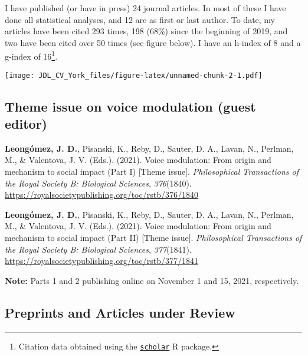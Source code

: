 \documentclass[11pt, a4paper]{awesome-cv}
\begin{document}
I have published (or have in press) 24 journal articles. In most of
these I have done all statistical analyses, and 12 are as first or last
author. To date, my articles have been cited 293 times, 198 (68\%) since
the beginning of 2019, and two have been cited over 50 times (see figure
below). I have an h-index of 8 and a g-index of 16\footnote{Citation
  data obtained using the
  \href{https://cran.r-project.org/web/packages/scholar/index.html}{\texttt{scholar}}
  R package.}.

\texttt{[image: JDL\_CV\_York\_files/figure-latex/unnamed-chunk-2-1.pdf]}

\hypertarget{section}{%
\subsection{\texorpdfstring{\textbf{Theme issue on voice modulation (guest editor)}}{}}\label{section}}

\begingroup
\setlength{\parindent}{-0.5in}
\setlength{\leftskip}{0.5in}

\hypertarget{refs_theme_issue}{}
\leavevmode{}%
\textbf{Leongómez, J. D.}, Pisanski, K., Reby, D., Sauter, D. A., Lavan,
N., Perlman, M., \& Valentova, J. V. (Eds.). (2021). Voice modulation:
From origin and mechanism to social impact ({Part I}) {[}{Theme
issue}{]}. \emph{Philosophical Transactions of the Royal Society B:
Biological Sciences}, \emph{376}(1840).
\url{https://royalsocietypublishing.org/toc/rstb/376/1840}

\leavevmode{}%
\textbf{Leongómez, J. D.}, Pisanski, K., Reby, D., Sauter, D. A., Lavan,
N., Perlman, M., \& Valentova, J. V. (Eds.). (2021). Voice modulation:
From origin and mechanism to social impact ({Part II}) {[}{Theme
issue}{]}. \emph{Philosophical Transactions of the Royal Society B:
Biological Sciences}, \emph{377}(1841).
\url{https://royalsocietypublishing.org/toc/rstb/377/1841}

\endgroup

\textbf{Note:} Parts 1 and 2 publishing online on November 1 and 15,
2021, respectively.

\hypertarget{section-1}{%
\subsection{\texorpdfstring{\textbf{Preprints and Articles under Review}}{}}\label{section-1}}

\begingroup
\setlength{\parindent}{-0.5in}
\setlength{\leftskip}{0.5in}
\end{document}
